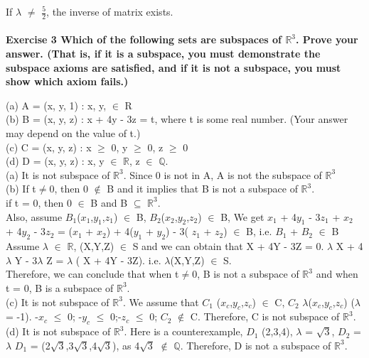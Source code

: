 \documentclass{article}
\begin{document}
If $\lambda$ $\neq$ $\frac{5}{2}$, the inverse of matrix exists.
\\\\
\textbf{Exercise 3 Which of the following sets are subspaces of $\mathbb{R}^{3}$. Prove your answer. (That is, if it is a subspace, you must demonstrate the subspace axioms are satisfied, and if it is not a subspace, you must show which axiom fails.)
}

(a) A = {(x, y, 1) : x, y, $\in$ R}\\
(b) B = {(x, y, z) : x + 4y - 3z = t}, where t is some real number. (Your answer may depend on the value of t.)\\
(c) C = {(x, y, z) : x $\geq$ 0, y $\geq$ 0, z $\geq$ 0}\\
(d) D = {(x, y, z) : x, y $\in$ $\mathbb{R}$, z $\in$ $\mathbb{Q}$}.\\

(a) It is not subspace of $\mathbb{R}^{3}$. Since 0 is not in A, A is not the subspace of $\mathbb{R}^{3}$ \\
(b) If t$\neq$0, then 0 $\notin$ B and it implies that B is not a subspace of $\mathbb{R}^{3}$.
\\ if t = 0, then 0 $\in$ B and B $\subseteq$ $\mathbb{R}^{3}$. \\
Also, assume $B_1$($x_1$,$y_1$,$z_1$) $\in$ B,  $B_2$($x_2$,$y_2$,$z_2$) $\in$ B, We get $x_1$ + 4$y_1$ - 3$z_1$ + $x_2$ + 4$y_2$ - 3$z_2$ = ($x_1$ + $x_2$) + 4($y_1$ + $y_2$) - 3( $z_1$ + $z_2$) $\in$ B, i.e. $B_1$ + $B_2$ $\in$ B\\
Assume $\lambda$ $\in$ $\mathbb{R}$, (X,Y,Z) $\in$ S and we can obtain that X + 4Y - 3Z = 0. 
$\lambda$ X + 4$\lambda$ Y - 3$\lambda$ Z = $\lambda$ ( X + 4Y - 3Z). i.e. $\lambda$(X,Y,Z) $\in$ S.\\
Therefore, we can conclude that when t$\neq$0, B is not a subspace of $\mathbb{R}^{3}$ and when t = 0, B is a subspace of $\mathbb{R}^{3}$.\\

(c) It is not subspace of $\mathbb{R}^{3}$. We assume that $C_1$ ($x_c$,$y_c$,$z_c$) $\in$ C, $C_2$ $\lambda$($x_c$,$y_c$,$z_c$) ($\lambda$ = -1). -$x_c$ $\leq$ 0; -$y_c$ $\leq$ 0;-$z_c$ $\leq$ 0; $C_2$ $\notin$ C. Therefore, C is not subspace of $\mathbb{R}^{3}$.\\


(d) It is not subspace of $\mathbb{R}^{3}$. Here is a counterexample, $D_1$ (2,3,4), $\lambda$ = $\sqrt{3}$, $D_2$ = $\lambda$ $D_1$ = (2$\sqrt{3}$,3$\sqrt{3}$,4$\sqrt{3}$), as 4$\sqrt{3}$ $\notin$ $\mathbb{Q}$. Therefore, D is not a subspace of $\mathbb{R}^{3}$.\\
\end{document}
